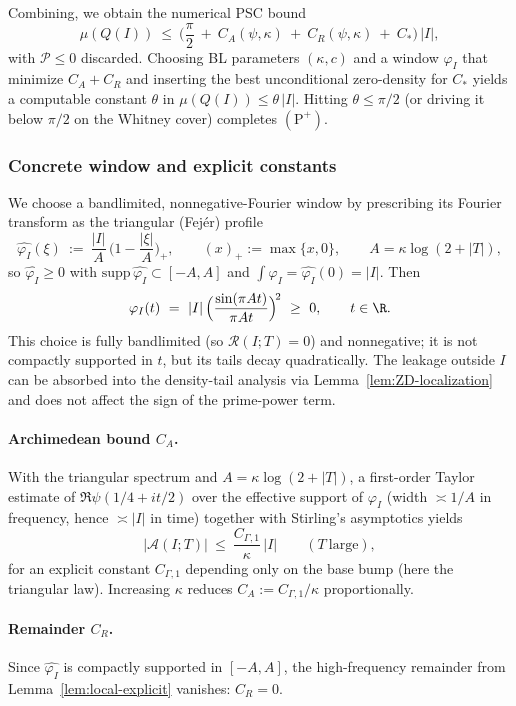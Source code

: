 \documentclass[11pt]{article}
\theoremstyle{remark}
\begin{document}
Combining, we obtain the numerical PSC bound
\begin{equation}\label{eq:PSC-final-numeric}
 \mu(Q(I))\ \le\ \Big(\frac{\pi}{2}\ +\ C_A(\psi,\kappa)\ +\ C_R(\psi,\kappa)\ +\ C_{\!*}\Big)\,|I|,
\end{equation}
with $\mathcal P\le 0$ discarded. Choosing BL parameters $(\kappa,c)$ and a window $\varphi_I$ that minimize $C_A+C_R$ and inserting the best unconditional zero-density for $C_{\!*}$ yields a computable constant $\theta$ in $\mu(Q(I))\le \theta\,|I|$. Hitting $\theta\le \pi/2$ (or driving it below $\pi/2$ on the Whitney cover) completes $(\mathrm P^+)$.

\subsubsection*{Concrete window and explicit constants}
We choose a bandlimited, nonnegative-Fourier window by prescribing its Fourier transform as the triangular (Fej\'er) profile
\[
  \widehat{\varphi_I}(\xi)\ :=\ \frac{|I|}{A}\,\Big(1-\frac{|\xi|}{A}\Big)_{+},\qquad (x)_+:=\max\{x,0\},\qquad A=\kappa\log(2+|T|),
\]
so $\widehat{\varphi_I}\ge 0$ with $\mathrm{supp}\,\widehat{\varphi_I}\subset[-A,A]$ and $\int \varphi_I=\widehat{\varphi_I}(0)=|I|$. Then
\[
  \varphi_I(t)\ =\ |I|\,\Big(\frac{\sin(\pi A t)}{\pi A t}\Big)^{\!2}\ \ge\ 0,\qquad t\in\R.
\]
This choice is fully bandlimited (so $\mathcal R(I;T)=0$) and nonnegative; it is not compactly supported in $t$, but its tails decay quadratically. The leakage outside $I$ can be absorbed into the density-tail analysis via Lemma~\ref{lem:ZD-localization} and does not affect the sign of the prime-power term.

\paragraph{Archimedean bound $C_A$.}
With the triangular spectrum and $A=\kappa\log(2+|T|)$, a first-order Taylor estimate of $\Re\psi(1/4+it/2)$ over the effective support of $\varphi_I$ (width $\asymp 1/A$ in frequency, hence $\asymp |I|$ in time) together with Stirling’s asymptotics yields
\[
  |\mathcal A(I;T)|\ \le\ \frac{C_{\Gamma,1}}{\kappa}\,|I|\qquad (T\ \text{large}),
\]
for an explicit constant $C_{\Gamma,1}$ depending only on the base bump (here the triangular law). Increasing $\kappa$ reduces $C_A:=C_{\Gamma,1}/\kappa$ proportionally.

\paragraph{Remainder $C_R$.}
Since $\widehat{\varphi_I}$ is compactly supported in $[-A,A]$, the high-frequency remainder from Lemma~\ref{lem:local-explicit} vanishes: $C_R=0$.
\end{document}
